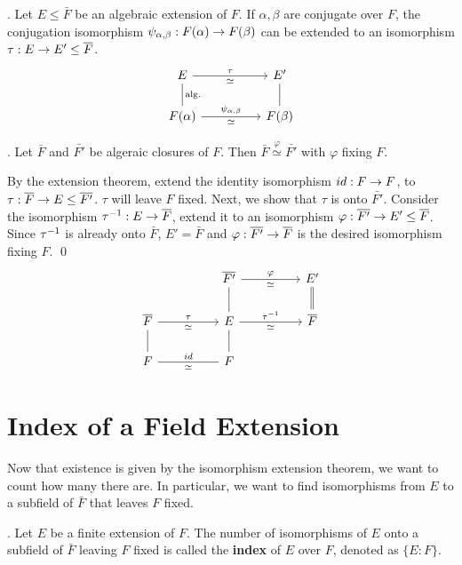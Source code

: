 \pagebreak

\cor. Let \(E \leq \bar{F}\) be an algebraic extension of \(F\). If \(\alpha, \beta\) are conjugate over \(F\), the conjugation isomorphism \(\psi_{\alpha, \beta} : F(\alpha) \rightarrow F(\beta)\) can be extended to an isomorphism \(\tau : E \ra E' \leq \bar{F}\).
\[
    \begin{tikzcd}
        E \arrow[dash]{d}{\text{alg.}} \arrow{rr}{\tau}[swap]{\simeq} & & E' \arrow[dash]{d} \\
        F(\alpha) \arrow{rr}{\psi_{\alpha, \beta}}[swap]{\simeq} & & F(\beta)
    \end{tikzcd}
\]

\cor. Let \(\bar{F}\) and \(\bar{F'}\) be algeraic closures of \(F\). Then \(\bar{F} \overset{\varphi}{\simeq} \bar{F'}\) with \(\varphi\) fixing \(F\).

\pf By the extension theorem, extend the identity isomorphism \(id : F \rightarrow F\), to \(\tau : \bar{F} \ra E \leq \bar{F'}\). \(\tau\) will leave \(F\) fixed. Next, we show that \(\tau\) is onto \(\bar{F'}\). Consider the isomorphism \(\tau\inv : E \ra \bar{F}\), extend it to an isomorphism \(\varphi : \bar{F'} \ra E' \leq \bar{F}\). Since \(\tau^{-1}\) is already onto \(\bar{F}\), \(E' = \bar{F}\) and \(\varphi : \bar{F'} \ra \bar{F}\) is the desired isomorphism fixing \(F\). \qed
\[
    \begin{tikzcd}
        & & \bar{F'} \arrow[dash]{d} \arrow{rr}{\varphi}[swap]{\simeq} & & E' \arrow[equal]{d}\\
        \bar{F} \arrow[dash]{d} \arrow{rr}{\tau}[swap]{\simeq} & & E \arrow[dash]{d} \arrow{rr}{\tau\inv}[swap]{\simeq} & & \bar{F} \\
        F \arrow[dash]{rr}{id}[swap]{\simeq} & & F
    \end{tikzcd}
\]

\section*{Index of a Field Extension}

Now that existence is given by the isomorphism extension theorem, we want to count how many there are. In particular, we want to find isomorphisms from \(E\) to a subfield of \(\bar{F}\) that leaves \(F\) fixed.

.  Let \(E\) be a finite extension of \(F\). The number of isomorphisms of \(E\) onto a subfield of \(\bar{F}\) leaving \(F\) fixed is called the \textbf{index} of \(E\) over \(F\), denoted as \(\{E : F\}\).

